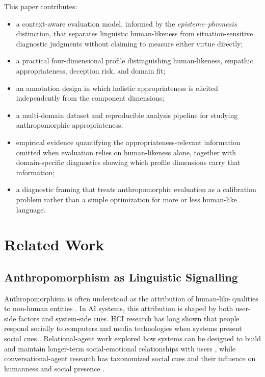 \documentclass[manuscript,review,anonymous]{acmart}
\begin{document}
This paper contributes:
\begin{itemize}[leftmargin=*]
    \item a context-aware evaluation model, informed by the \textit{episteme}--\textit{phronesis} distinction, that separates linguistic human-likeness from situation-sensitive diagnostic judgments without claiming to measure either virtue directly;
    \item a practical four-dimensional profile distinguishing human-likeness, empathic appropriateness, deception risk, and domain fit;
    \item an annotation design in which holistic appropriateness is elicited independently from the component dimensions;
    \item a multi-domain dataset and reproducible analysis pipeline for studying anthropomorphic appropriateness;
    \item empirical evidence quantifying the appropriateness-relevant information omitted when evaluation relies on human-likeness alone, together with domain-specific diagnostics showing which profile dimensions carry that information;
    \item a diagnostic framing that treats anthropomorphic evaluation as a calibration problem rather than a simple optimization for more or less human-like language.
\end{itemize}

\section{Related Work}

\subsection{Anthropomorphism as Linguistic Signalling}

Anthropomorphism is often understood as the attribution of human-like qualities to non-human entities \cite{epley2007,waytz2010,epley2008}. In AI systems, this attribution is shaped by both user-side factors and system-side cues. HCI research has long shown that people respond socially to computers and media technologies when systems present social cues \cite{nass1994,reeves1996,nass2000}. Relational-agent work explored how systems can be designed to build and maintain longer-term social-emotional relationships with users \cite{bickmore2005}, while conversational-agent research has taxonomized social cues and their influence on humanness and social presence \cite{feine2019,araujo2018,go2019}.
\end{document}
